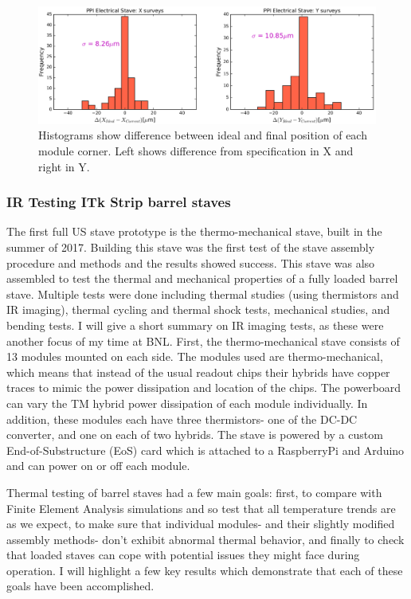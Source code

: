 \begin{figure}[!h]
        \centering
    \includegraphics[width=.8\textwidth]{Pictures/placementresults.png}
    \caption{Histograms show difference between ideal and final position of each module corner. Left shows difference from specification in X and right in Y.}
    \label{fig:placementresults}
\end{figure}

\subsubsection{IR Testing ITk Strip barrel staves}
The first full US stave prototype is the thermo-mechanical stave, built in the summer of 2017.  Building this stave was the first test of the stave assembly procedure and methods and the results showed success. This stave was also assembled to test the thermal and mechanical properties of a fully loaded barrel stave. Multiple tests were done including thermal studies (using thermistors and IR imaging), thermal cycling and thermal shock tests, mechanical studies, and bending tests. I will give a short summary on IR imaging tests, as these were another focus of my time at BNL. First, the thermo-mechanical stave consists of 13 modules mounted on each side. The modules used are thermo-mechanical, which means that instead of the usual readout chips their hybrids have copper traces to mimic the power dissipation and location of the chips. The powerboard can vary the TM hybrid power dissipation of each module individually. In addition, these modules each have three thermistors- one of the DC-DC converter, and one on each of two hybrids. The stave is powered by a custom End-of-Substructure (EoS) card which is attached to a RaspberryPi and Arduino and can power on or off each module.  

Thermal testing of barrel staves had a few main goals: first, to compare with Finite Element Analysis simulations and so test that all temperature trends are as we expect, to make sure that individual modules- and their slightly modified assembly methods- don't exhibit abnormal thermal behavior, and finally to check that loaded staves can cope with potential issues they might face during operation. I will highlight a few key results which demonstrate that each of these goals have been accomplished. 

